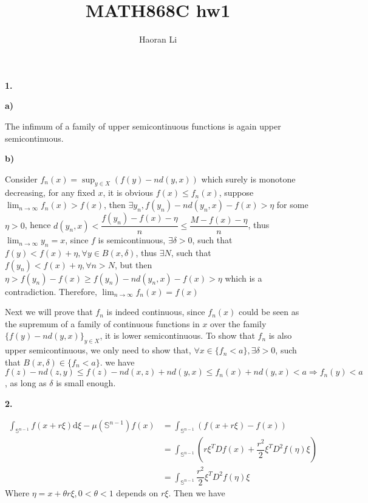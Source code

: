 \documentclass{article}
\title{MATH868C hw1}
\author{Haoran Li}
\date{}
\begin{document}
\maketitle

\setlength{\parindent}{0cm}

\textbf{1.} \par
\textbf{a)} \par
The infimum of a family of upper semicontinuous functions is again upper semicontinuous. \par
\textbf{b)} \par
Consider $ f_{n}(x) = \sup_{y\in X}\left( f(y) - nd(y,x) \right) $ which surely is monotone decreasing, for any fixed $x$, it is obvious \(f(x)\leq f_{n}(x)\), suppose $\lim_{n\rightarrow \infty}f_{n}(x)>f(x)$, then \(\exists y_{n}, f(y_{n})-nd(y_{n},x)-f(x)>\eta \) for some \(\eta>0\), hence \(d(y_{n},x)<\dfrac{f(y_{n})-f(x)-\eta}{n}\leq\dfrac{M-f(x)-\eta}{n}\), thus \(\lim_{n\rightarrow \infty}y_{n}=x\), since \(f\) is semicontinuous, \(\exists\delta>0\), such that\(f(y)<f(x)+\eta, \forall y\in B(x,\delta)\), thus \(\exists N\), such that \(f(y_{n})<f(x)+\eta, \forall n>N\), but then \(\eta>f(y_{n})-f(x)\geq f(y_{n})-nd(y_{n},x)-f(x)>\eta\) which is a contradiction. Therefore, $\lim_{n\rightarrow \infty}f_{n}(x)=f(x)$ \par
Next we will prove that \(f_{n}\) is indeed continuous, since $ f_{n}(x) $ could be seen as the supremum of a family of continuous functions in $x$ over the family \(\{f(y) - nd(y,x)\}_{y\in X}\), it is lower semicontinuous. To show that \(f_{n}\) is also upper semicontinuous, we only need to show that, \(\forall x\in\{f_{n}<a\}, \exists\delta>0\), such that \(B(x,\delta)\in\{f_{n}<a\}\). 
we have \(f(z)-nd(z,y)\leq f(z)-nd(x,z)+nd(y,x)\leq f_{n}(x)+nd(y,x)<a\Rightarrow f_{n}(y)<a\), as long as $\delta$ is small enough. \par
\textbf{2.} \par
\[
\begin{aligned}
\int_{\mathbb{S}^{n-1}}f(x+r\xi)\mathrm{d}\xi-\mu(\mathbb{S}^{n-1})f(x)
&=\int_{\mathbb{S}^{n-1}}\left(f(x+r\xi)-f(x)\right) \\
&=\int_{\mathbb{S}^{n-1}}\left(r\xi^{T}Df(x)+\dfrac{r^{2}}{2}\xi^{T}D^{2}f(\eta)\xi\right) \\
&=\int_{\mathbb{S}^{n-1}}\dfrac{r^{2}}{2}\xi^{T}D^{2}f(\eta)\xi
\end{aligned}
\]
Where \(\eta=x+\theta r\xi, 0<\theta<1\) depends on \(r\xi\).  Then we have\par
\end{document}
